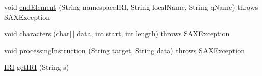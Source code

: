 \begin{DoxyCompactItemize}
\item 
void \hyperlink{classorg_1_1semanticweb_1_1owlapi_1_1rdf_1_1syntax_1_1_r_d_f_parser_a01ea9cc3422ca60d56dc309e74c3e990}{end\-Element} (String namespace\-I\-R\-I, String local\-Name, String q\-Name)  throws S\-A\-X\-Exception 
\item 
void \hyperlink{classorg_1_1semanticweb_1_1owlapi_1_1rdf_1_1syntax_1_1_r_d_f_parser_a9a4993fb4047e86ab50abc7453faecde}{characters} (char\mbox{[}$\,$\mbox{]} data, int start, int length)  throws S\-A\-X\-Exception 
\item 
void \hyperlink{classorg_1_1semanticweb_1_1owlapi_1_1rdf_1_1syntax_1_1_r_d_f_parser_a340a0ef1f72c6d7a08a4b3b8dcb9ac7b}{processing\-Instruction} (String target, String data)  throws S\-A\-X\-Exception 
\item 
\hyperlink{classorg_1_1semanticweb_1_1owlapi_1_1model_1_1_i_r_i}{I\-R\-I} \hyperlink{classorg_1_1semanticweb_1_1owlapi_1_1rdf_1_1syntax_1_1_r_d_f_parser_a15bb9214e53385a6c5646d632c65248f}{get\-I\-R\-I} (String s)
\end{DoxyCompactItemize}
